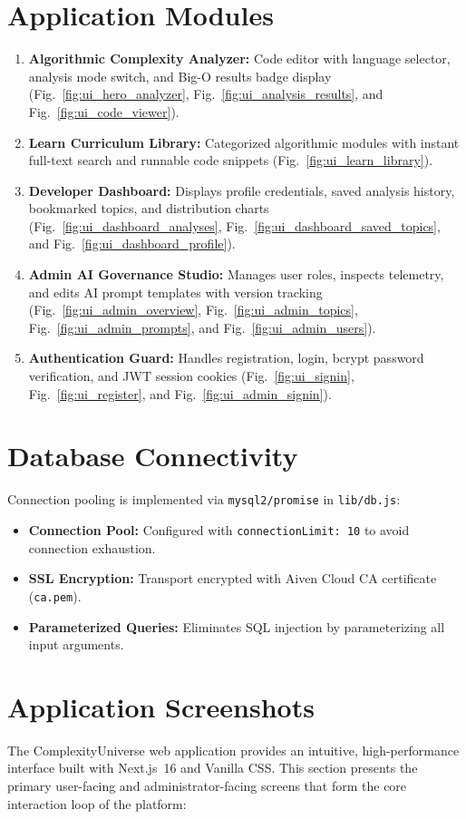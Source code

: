 \documentclass[12pt,a4paper]{report}
\DeclareRobustCommand{\_}{\textunderscore\allowbreak}
\begin{document}
\section{Application Modules}
\begin{enumerate}
    \item \textbf{Algorithmic Complexity Analyzer:} Code editor with language selector, analysis mode switch, and Big-O results badge display (Fig.~\ref{fig:ui_hero_analyzer}, Fig.~\ref{fig:ui_analysis_results}, and Fig.~\ref{fig:ui_code_viewer}).
    \item \textbf{Learn Curriculum Library:} Categorized algorithmic modules with instant full-text search and runnable code snippets (Fig.~\ref{fig:ui_learn_library}).
    \item \textbf{Developer Dashboard:} Displays profile credentials, saved analysis history, bookmarked topics, and distribution charts (Fig.~\ref{fig:ui_dashboard_analyses}, Fig.~\ref{fig:ui_dashboard_saved_topics}, and Fig.~\ref{fig:ui_dashboard_profile}).
    \item \textbf{Admin AI Governance Studio:} Manages user roles, inspects telemetry, and edits AI prompt templates with version tracking (Fig.~\ref{fig:ui_admin_overview}, Fig.~\ref{fig:ui_admin_topics}, Fig.~\ref{fig:ui_admin_prompts}, and Fig.~\ref{fig:ui_admin_users}).
    \item \textbf{Authentication Guard:} Handles registration, login, bcrypt password verification, and JWT session cookies (Fig.~\ref{fig:ui_signin}, Fig.~\ref{fig:ui_register}, and Fig.~\ref{fig:ui_admin_signin}).
\end{enumerate}

\section{Database Connectivity}
Connection pooling is implemented via \texttt{mysql2/promise} in \texttt{lib/db.js}:
\begin{itemize}
    \item \textbf{Connection Pool:} Configured with \texttt{connectionLimit: 10} to avoid connection exhaustion.
    \item \textbf{SSL Encryption:} Transport encrypted with Aiven Cloud CA certificate (\texttt{ca.pem}).
    \item \textbf{Parameterized Queries:} Eliminates SQL injection by parameterizing all input arguments.
\end{itemize}

\section{Application Screenshots}
The ComplexityUniverse web application provides an intuitive, high-performance interface built with Next.js~16 and Vanilla CSS. This section presents the primary user-facing and administrator-facing screens that form the core interaction loop of the platform:
\end{document}
